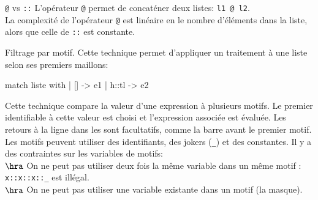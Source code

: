 \documentclass[french, 11pt]{article}
\begin{document}
\vspace*{-0.7cm}

\begin{defi}{\texttt{@} vs \texttt{::}}{}
    L'opérateur \texttt{@} permet de concaténer deux listes: \texttt{l1 @ l2}.\\
    La complexité de l'opérateur \texttt{@} est linéaire en le nombre d'éléments dans la liste, alors que celle de \texttt{::} est constante.
\end{defi}

\vspace*{-0.7cm}

\begin{defi}{Filtrage par motif.}{}
    Cette technique permet d'appliquer un traitement à une liste selon ses premiers maillons:
    \begin{pygmented}[lang=ocaml, hidealllines=true, linenos=true]
    match liste with
    | [] -> e1
    | h::tl -> e2
    \end{pygmented}
    Cette technique compare la valeur d'une expression à plusieurs motifs. Le premier identifiable à cette valeur est choisi et l'expression associée est évaluée.\n
    Les retours à la ligne dans les  sont facultatifs, comme la barre avant le premier motif.\n
    Les motifs peuvent utiliser des identifiants, des jokers (\texttt{\_}) et des constantes. Il y a des contraintes sur les variables de motifs:\\
    $\hra$ On ne peut pas utiliser deux fois la même variable dans un même motif : \texttt{x::x::x::\_} est illégal.\\
    $\hra$ On ne peut pas utiliser une variable existante dans un motif (la masque).
\end{defi}

\vspace*{-0.7cm}
\end{document}
